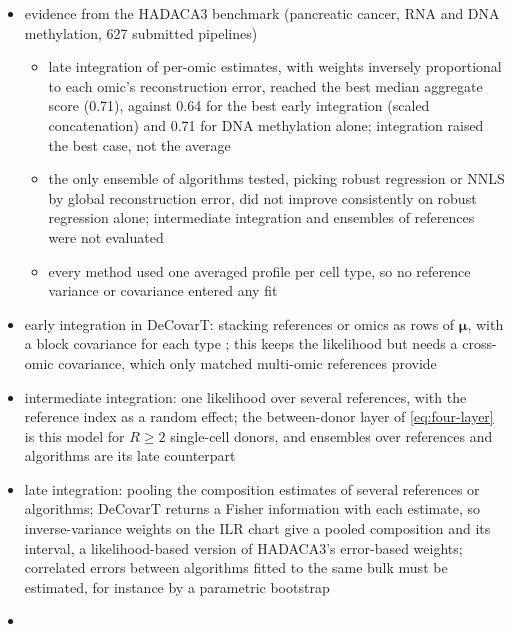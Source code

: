 \documentclass[pdflatex, sn-nature]{sn-jnl}
\theoremstyle{thmstyleone}%
\theoremstyle{thmstyletwo}%
\theoremstyle{thmstylethree}%
\begin{document}
\begin{itemize}
  \item evidence from the HADACA3 benchmark (pancreatic cancer, RNA and DNA methylation, 627 submitted pipelines)
        \cite{barbotPromisesLimitsMultimodal2026}
  \begin{itemize}
    \item late integration of per-omic estimates, with weights inversely proportional to each omic's reconstruction
          error, reached the best median aggregate score (0.71), against 0.64 for the best early integration (scaled
          concatenation) and 0.71 for DNA methylation alone; integration raised the best case, not the average
    \item the only ensemble of algorithms tested, picking robust regression or NNLS by global reconstruction error,
          did not improve consistently on robust regression alone; intermediate integration and ensembles of
          references were not evaluated
    \item every method used one averaged profile per cell type, so no reference variance or covariance entered any fit
  \end{itemize}
  \item early integration in DeCovarT: stacking references or omics as rows of \(\boldsymbol{\mu}\), with a block
        covariance for each type \cite{chenUnicoUnifiedModelCell2025}; this keeps the likelihood but needs a cross-omic
        covariance, which only matched multi-omic references provide
  \item intermediate integration: one likelihood over several references, with the reference index as a random
        effect; the between-donor layer of \eqref{eq:four-layer} is this model for \(R\ge2\) single-cell donors, and
        ensembles over references and algorithms \cite{caiRobustAccurateEstimation2022} are its late counterpart
  \item late integration: pooling the composition estimates of several references or algorithms; DeCovarT returns a
        Fisher information with each estimate, so inverse-variance weights on the ILR chart give a pooled composition
        and its interval, a likelihood-based version of HADACA3's error-based weights; correlated errors between
        algorithms fitted to the same bulk must be estimated, for instance by a parametric bootstrap
  \item[] 
\end{itemize}
\end{document}

